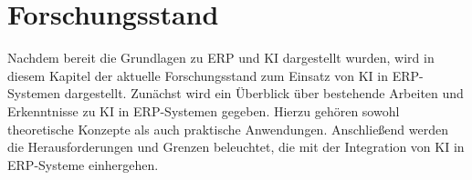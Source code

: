 \section{Forschungsstand}
Nachdem bereit die Grundlagen zu \ac{ERP} und \ac{KI} dargestellt wurden, wird in diesem Kapitel der aktuelle Forschungsstand zum Einsatz von \ac{KI} in \ac{ERP}-Systemen dargestellt. Zunächst wird ein Überblick über bestehende Arbeiten und Erkenntnisse zu \ac{KI} in \ac{ERP}-Systemen gegeben. Hierzu gehören sowohl theoretische Konzepte als auch praktische Anwendungen. Anschließend werden die Herausforderungen und Grenzen beleuchtet, die mit der Integration von \ac{KI} in \ac{ERP}-Systeme einhergehen.


